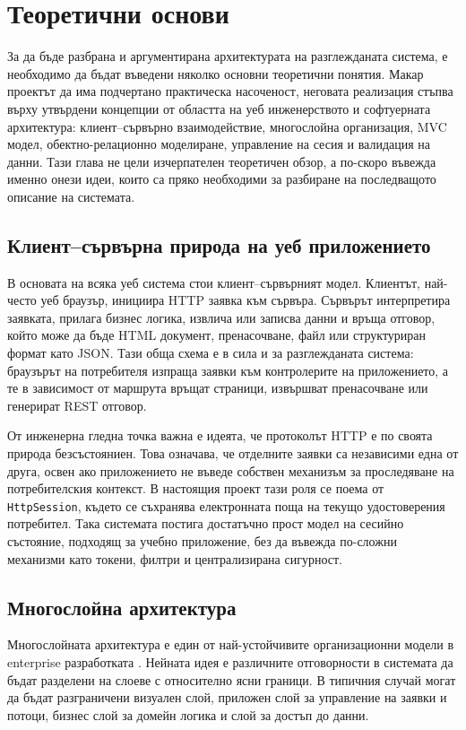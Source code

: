 \section{Теоретични основи}

За да бъде разбрана и аргументирана архитектурата на разглежданата система, е необходимо да бъдат въведени няколко основни теоретични понятия. Макар проектът да има подчертано практическа насоченост, неговата реализация стъпва върху утвърдени концепции от областта на уеб инженерството и софтуерната архитектура: клиент--сървърно взаимодействие, многослойна организация, MVC модел, обектно-релационно моделиране, управление на сесия и валидация на данни. Тази глава не цели изчерпателен теоретичен обзор, а по-скоро въвежда именно онези идеи, които са пряко необходими за разбиране на последващото описание на системата.

\subsection{Клиент--сървърна природа на уеб приложението}

В основата на всяка уеб система стои клиент--сървърният модел. Клиентът, най-често уеб браузър, инициира HTTP заявка към сървъра. Сървърът интерпретира заявката, прилага бизнес логика, извлича или записва данни и връща отговор, който може да бъде HTML документ, пренасочване, файл или структуриран формат като JSON. Тази обща схема е в сила и за разглежданата система: браузърът на потребителя изпраща заявки към контролерите на приложението, а те в зависимост от маршрута връщат страници, извършват пренасочване или генерират REST отговор.

От инженерна гледна точка важна е идеята, че протоколът HTTP е по своята природа безсъстояниен. Това означава, че отделните заявки са независими една от друга, освен ако приложението не въведе собствен механизъм за проследяване на потребителския контекст. В настоящия проект тази роля се поема от \texttt{HttpSession}, където се съхранява електронната поща на текущо удостоверения потребител. Така системата постига достатъчно прост модел на сесийно състояние, подходящ за учебно приложение, без да въвежда по-сложни механизми като токени, филтри и централизирана сигурност.

\subsection{Многослойна архитектура}

Многослойната архитектура е един от най-устойчивите организационни модели в enterprise разработката \cite{fowler,sommerville}. Нейната идея е различните отговорности в системата да бъдат разделени на слоеве с относително ясни граници. В типичния случай могат да бъдат разграничени визуален слой, приложен слой за управление на заявки и потоци, бизнес слой за домейн логика и слой за достъп до данни.

